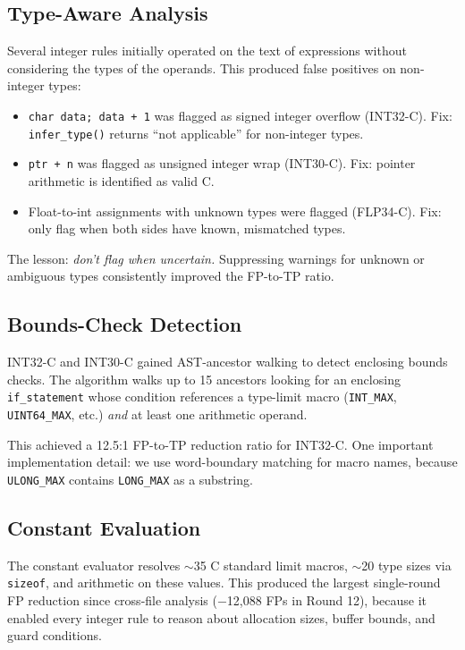 \documentclass[10pt,twocolumn,letterpaper]{article}
\begin{document}
\subsection{Type-Aware Analysis}

Several integer rules initially operated on the text of expressions
without considering the types of the operands.  This produced false
positives on non-integer types:

\begin{itemize}
    \item \texttt{char data; data + 1} was flagged as signed integer
        overflow (INT32-C).  Fix: \texttt{infer\_type()} returns
        ``not applicable'' for non-integer types.
    \item \texttt{ptr + n} was flagged as unsigned integer wrap
        (INT30-C).  Fix: pointer arithmetic is identified as valid C.
    \item Float-to-int assignments with unknown types were flagged
        (FLP34-C).  Fix: only flag when both sides have known,
        mismatched types.
\end{itemize}

The lesson: \emph{don't flag when uncertain.}  Suppressing warnings
for unknown or ambiguous types consistently improved the FP-to-TP
ratio.

\subsection{Bounds-Check Detection}

INT32-C and INT30-C gained AST-ancestor walking to detect enclosing
bounds checks.  The algorithm walks up to 15 ancestors looking for an
enclosing \texttt{if\_statement} whose condition references a type-limit
macro (\texttt{INT\_MAX}, \texttt{UINT64\_MAX}, etc.) \emph{and} at
least one arithmetic operand.

This achieved a 12.5:1 FP-to-TP reduction ratio for INT32-C.  One
important implementation detail: we use word-boundary matching for
macro names, because \texttt{ULONG\_MAX} contains \texttt{LONG\_MAX}
as a substring.

\subsection{Constant Evaluation}

The constant evaluator resolves $\sim$35 C standard limit macros,
$\sim$20 type sizes via \texttt{sizeof}, and arithmetic on these
values.  This produced the largest single-round FP reduction since
cross-file analysis ($-$12,088 FPs in Round 12), because it enabled
every integer rule to reason about allocation sizes, buffer bounds,
and guard conditions.
\end{document}
